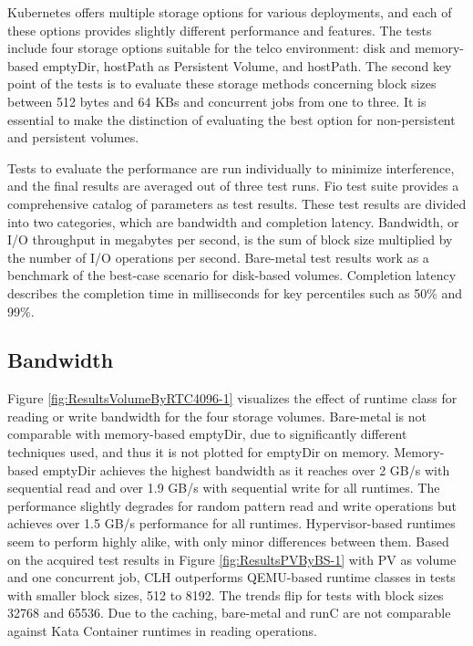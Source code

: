 Kubernetes offers multiple storage options for various deployments, and each of these options provides slightly different performance and features. The tests include four storage options suitable for the telco environment: disk and memory-based emptyDir, hostPath as Persistent Volume, and hostPath. The second key point of the tests is to evaluate these storage methods concerning block sizes between 512 bytes and 64 KBs and concurrent jobs from one to three. It is essential to make the distinction of evaluating the best option for non-persistent and persistent volumes.

Tests to evaluate the performance are run individually to minimize interference, and the final results are averaged out of three test runs. Fio test suite provides a comprehensive catalog of parameters as test results. These test results are divided into two categories, which are bandwidth and completion latency. Bandwidth, or I/O throughput in megabytes per second, is the sum of block size multiplied by the number of I/O operations per second. Bare-metal test results work as a benchmark of the best-case scenario for disk-based volumes. Completion latency describes the completion time in milliseconds for key percentiles such as 50\% and 99\%. 

\subsection{Bandwidth}

Figure \ref{fig:ResultsVolumeByRTC4096-1} visualizes the effect of runtime class for reading or write bandwidth for the four storage volumes. Bare-metal is not comparable with memory-based emptyDir, due to significantly different techniques used, and thus it is not plotted for emptyDir on memory. Memory-based emptyDir achieves the highest bandwidth as it reaches over 2 GB/s with sequential read and over 1.9 GB/s with sequential write for all runtimes. The performance slightly degrades for random pattern read and write operations but achieves over 1.5 GB/s performance for all runtimes. Hypervisor-based runtimes seem to perform highly alike, with only minor differences between them. Based on the acquired test results in Figure \ref{fig:ResultsPVByBS-1} with PV as volume and one concurrent job, CLH outperforms QEMU-based runtime classes in tests with smaller block sizes, 512 to 8192. The trends flip for tests with block sizes 32768 and 65536. Due to the caching, bare-metal and runC are not comparable against Kata Container runtimes in reading operations.

